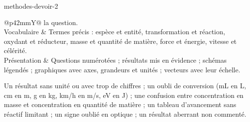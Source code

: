 \begin{blocEdition}{methodes-devoir-2}
\begin{tabularx}{\linewidth}{@{}p{42mm}Y@{}}
la question. \\[1mm]
Vocabulaire & Termes précis : espèce et entité, transformation et réaction, oxydant et réducteur, masse et quantité de matière,
force et énergie, vitesse et célérité. \\[1mm]
Présentation & Questions numérotées ; résultats mis en évidence ; schémas légendés ; graphiques avec axes, grandeurs et
unités ; vecteurs avec leur échelle. \\\bottomrule
\end{tabularx}
Un résultat sans unité ou avec trop de chiffres ; un oubli de conversion (mL en L, cm en m, g en kg, km/h en m/s, eV en J) ;
une confusion entre concentration en masse et concentration en quantité de matière ; un tableau d'avancement sans
réactif limitant ; un signe oublié en optique ; un résultat aberrant non commenté.
\end{blocEdition}

